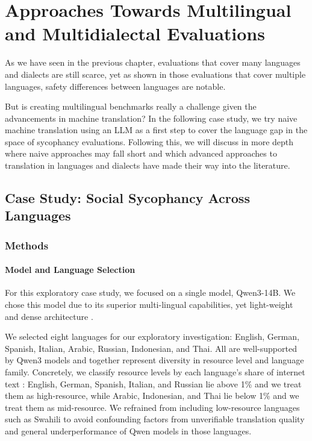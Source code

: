 \chapter{Approaches Towards Multilingual and Multidialectal Evaluations}
\label{chap:translations}
As we have seen in the previous chapter, evaluations that cover many languages and dialects are still scarce, yet as shown in those evaluations that cover multiple languages, safety differences between languages are notable. 

But is creating multilingual benchmarks really a  challenge given the advancements in machine translation? In the following case study, we try naive machine translation using an LLM as a first step to cover the language gap in the space of sycophancy evaluations. Following this, we will discuss in more depth where naive approaches may fall short and which advanced approaches to translation in languages and dialects have made their way into the literature.

\section{Case Study: Social Sycophancy Across Languages}
\label{cs:social_syc}
\subsection{Methods}
\subsubsection{Model and Language Selection}
For this exploratory case study, we focused on a single model, Qwen3-14B. We chose this model due to its superior multi-lingual capabilities, yet light-weight and dense architecture \cite{yang2025qwen3-207}. 

We selected eight languages for our exploratory investigation: English, German, Spanish, Italian, Arabic, Russian, Indonesian, and Thai. All are well-supported by Qwen3 models \cite{yang2025qwen3-207} and together represent diversity in resource level and language family. Concretely, we classify resource levels by each language's share of internet text \cite{wikipedianoyearlanguages-eb1, barua2025long-c41}: English, German, Spanish, Italian, and Russian lie above 1\% and we treat them as high-resource, while Arabic, Indonesian, and Thai lie below 1\% and we treat them as mid-resource. We refrained from including low-resource languages such as Swahili to avoid confounding factors from unverifiable translation quality and general underperformance of Qwen models in those languages.

